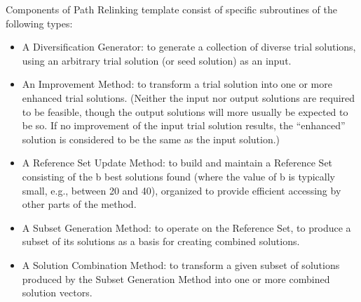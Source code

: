 Components of Path Relinking template \cite{glover1998template} consist of
specific subroutines of the following types:
\begin{itemize}
\item A Diversification Generator: 
  to generate a collection of diverse trial solutions,
  using an arbitrary trial solution (or seed solution) as an input.
\item An Improvement Method:
  to transform a trial solution into one or more enhanced trial solutions. 
  (Neither the input nor output solutions are required to be feasible,
  though the output solutions will more usually be expected to be so.
  If no improvement of the input trial solution results, 
  the ``enhanced'' solution is considered to be the same as the input solution.)
\item A Reference Set Update Method:
  to build and maintain a Reference Set
  consisting of the b best solutions found
  (where the value of b is typically small, e.g., between 20 and 40), 
  organized to provide efficient accessing by other parts of the method.
\item A Subset Generation Method: 
  to operate on the Reference Set, 
  to produce a subset of its solutions 
  as a basis for creating combined solutions.
\item A Solution Combination Method:
  to transform a given subset of solutions 
  produced by the Subset Generation Method
  into one or more combined solution vectors.
\end{itemize}
